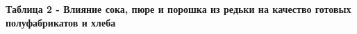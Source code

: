 
{\bfseries Таблица 2 - Влияние сока, пюре и порошка из редьки на качество
готовых полуфабрикатов и хлеба}

